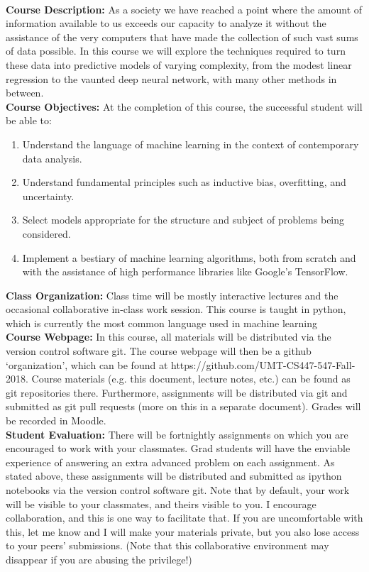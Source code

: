 \documentclass[11pt]{article}
\begin{document}
\textbf {\large \\ Course Description:} As a society we have reached a point where the amount of information available to us exceeds our capacity to analyze it without the assistance of the very computers that have made the collection of such vast sums of data possible.  In this course we will explore the techniques required to turn these data into predictive models of varying complexity, from the modest linear regression to the vaunted deep neural network, with many other methods in between. \vspace{5mm} \\
\textbf{\large Course Objectives:} At the completion of this course, the successful student will be able to:
\begin{enumerate}
  \item Understand the language of machine learning in the context of contemporary data analysis.
  \item Understand fundamental principles such as inductive bias, overfitting, and uncertainty. 
  \item Select models appropriate for the structure and subject of problems being considered.
  \item Implement a bestiary of machine learning algorithms, both from scratch and with the assistance of high performance libraries like Google's TensorFlow.
\end{enumerate}
\textbf{\large Class Organization:} Class time will be mostly interactive lectures and the occasional collaborative in-class work session.  This course is taught in python, which is currently the most common language used in machine learning  
\vspace{5mm}\\
\textbf{\large Course Webpage:} In this course, all materials will be distributed via the version control software git.  The course webpage will then be a github `organization', which can be found at https://github.com/UMT-CS447-547-Fall-2018.  Course materials (e.g. this document, lecture notes, etc.) can be found as git repositories there.  Furthermore, assignments will be distributed via git and submitted as git pull requests (more on this in a separate document).  Grades will be recorded in Moodle.
\vspace{5mm}\\
\textbf{\large Student Evaluation:}
There will be fortnightly assignments on which you are encouraged to work with your classmates.  Grad students will have the enviable experience of answering an extra advanced problem on each assignment.  As stated above, these assignments will be distributed and submitted as ipython notebooks via the version control software git.  Note that by default, your work will be visible to your classmates, and theirs visible to you.  I encourage collaboration, and this is one way to facilitate that.  If you are uncomfortable with this, let me know and I will make your materials private, but you also lose access to your peers' submissions.  (Note that this collaborative environment may disappear if you are abusing the privilege!)
\end{document}
